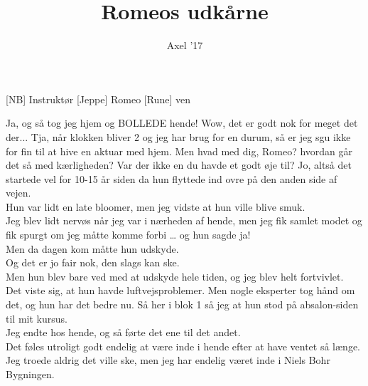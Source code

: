 \documentclass[a4paper,11pt]{article}
\title{Romeos udk\aa rne}
\author{Axel '17}
\begin{document}
\maketitle

\begin{roles}
[NB] Instruktør
[Jeppe] Romeo
[Rune] ven
\end{roles}



\begin{sketch}

 Ja, og så tog jeg hjem og BOLLEDE hende!
 Wow, det er godt nok for meget det der... 
 Tja, når klokken bliver 2 og jeg har brug for en durum, så er jeg sgu ikke for fin til at hive en aktuar med hjem. 
 Men hvad med dig, Romeo? hvordan går det så med kærligheden? Var der ikke en du havde et godt øje til?
 Jo, altså det startede vel for 10-15 år siden da hun flyttede ind ovre på den anden side af vejen.\\
Hun var lidt en late bloomer, men jeg vidste at hun ville blive smuk.\\
Jeg blev lidt nervøs når jeg var i nærheden af hende, men jeg fik samlet modet og fik spurgt om jeg måtte komme forbi … og hun sagde ja!\\
Men da dagen kom måtte hun udskyde.\\
Og det er jo fair nok, den slags kan ske.\\
Men hun blev bare ved med at udskyde hele tiden, og jeg blev helt fortvivlet.\\
Det viste sig, at hun havde luftvejsproblemer. Men nogle eksperter tog hånd om det, og hun har det bedre nu.
Så her i blok 1 så jeg at hun stod på absalon-siden til mit kursus.\\
Jeg endte hos hende, og så førte det ene til det andet. \\
Det føles utroligt godt endelig at være inde i hende efter at have ventet så længe.\\
Jeg troede aldrig det ville ske, 
men jeg har endelig været inde i Niels Bohr Bygningen.\\


\end{sketch}
\end{document}
